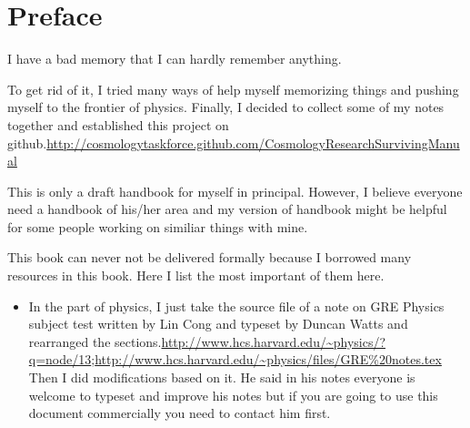 \chapter{Preface}

I have a bad memory that I can hardly remember anything.

To get rid of it, I tried many ways of help myself memorizing things and pushing myself to the frontier of physics. Finally, I decided to collect some of my notes together and established this project on github.\url{http://cosmologytaskforce.github.com/CosmologyResearchSurvivingManual}

This is only a draft handbook for myself in principal. However, I believe everyone need a handbook of his/her area and my version of handbook might be helpful for some people working on similiar things with mine.

This book can never not be delivered formally because I borrowed many resources in this book. Here I list the most important of them here.

\begin{itemize}
\item
In the part of physics, I just take the source file of a note on GRE Physics subject test written by Lin Cong and typeset by Duncan Watts and rearranged the sections.\url{http://www.hcs.harvard.edu/~physics/?q=node/13};\url{http://www.hcs.harvard.edu/~physics/files/GRE\%20notes.tex} Then I did modifications based on it.
He said in his notes everyone is welcome to typeset and improve his notes but if you are going to use this document commercially you need to contact him first.
\end{itemize}
